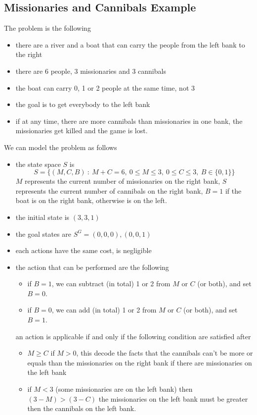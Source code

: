 \documentclass[10pt, letterpaper]{report}
\begin{document}
\subsection{Missionaries and Cannibals Example}
The problem is the following\begin{itemize}
    \item there are a river and a boat that can carry the people from the left bank to the right 
    \item there are 6 people, 3 missionaries and 3 cannibals 
    \item the boat can carry 0, 1 or 2 people at the same time, not 3 
    \item the goal is to get  everybody to the left bank
    \item if at any time, there are more cannibals than missionaries in one bank, the missionaries get killed and the game is lost. 
\end{itemize}
We can model the problem as follows\begin{itemize}
    \item the state space $S$ is \begin{equation}
        S=\{(M,C,B) \ : \ M+C=6, \ 0\le M \le 3, \ 0\le C \le 3, \  B\in\{0,1\}\}
    \end{equation}
    $M$ represents the current number of missionaries on the right bank, $S$ represents the current number of cannibals on the right bank, $B=1$ if the boat is on the right bank, otherwise is on the left.
    \item the initial state is $(3,3,1)$
    \item the goal states are $S^G={(0,0,0),(0,0,1)}$
    \item each actions have the same cost, is negligible
    \item the action that can be performed are the following\begin{itemize}
        \item if $B=1$, we can subtract (in total) 1 or 2 from $M$ or $C$ (or both), and set $B=0$.
        \item if $B=0$, we can add (in total) 1 or 2 from $M$ or $C$ (or both), and set $B=1$.
    \end{itemize}
    an action is applicable if and only if the following condition are satisfied after\begin{itemize}
        \item $M\ge C$ if $M>0$, this decode the facts that the cannibals can't be more or equals than the missionaries on the right bank if there are missionaries on the left bank
        \item if $M<3$ (some missionaries are on the left bank) then $(3-M)>(3-C)$ the missionaries on the left bank must be greater then the cannibals on the left bank.
    \end{itemize}
\end{itemize}
\end{document}

